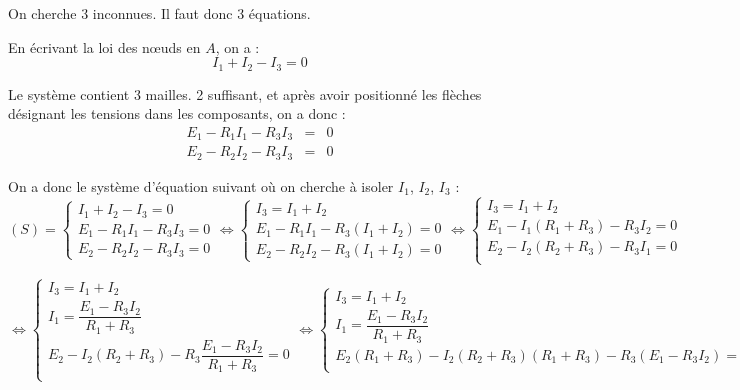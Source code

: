 \documentclass[10pt]{article}
\newif\ifprof
\begin{document}
\ifprof
\begin{corrige}
On cherche 3 inconnues. Il faut donc 3 équations. 

En écrivant la loi des n\oe uds en $A$, on a : 
$$
I_1 + I_2 - I_3 = 0
$$

Le système contient 3 mailles. 2 suffisant, et après avoir positionné les flèches désignant les tensions dans les composants, on a donc :
\begin{eqnarray*}
E_1 - R_1 I_1 - R_3 I_3 &=& 0 \\
E_2 - R_2 I_2 - R_3 I_3 &=& 0 
\end{eqnarray*}

On a donc le système d'équation suivant où on cherche à isoler $I_1$, $I_2$, $I_3$ :
$$
(S) = \left\{
\begin{array}{l}
I_1 + I_2 - I_3 = 0 \\
E_1 - R_1 I_1 - R_3 I_3 = 0 \\
E_2 - R_2 I_2 - R_3 I_3 = 0 
\end{array}
\right.
\Longleftrightarrow
\left\{
\begin{array}{l}
I_3 = I_1 + I_2  \\
E_1 - R_1 I_1 - R_3\left( I_1 + I_2 \right)= 0 \\
E_2 - R_2 I_2 - R_3 \left( I_1 + I_2 \right) = 0 
\end{array}
\right.
\Longleftrightarrow
\left\{
\begin{array}{l}
I_3 = I_1 + I_2  \\
E_1 -I_1 \left( R_1 + R_3\right)  - R_3 I_2= 0 \\
E_2 -I_2 \left( R_2 + R_3\right)  - R_3 I_1= 0 \\
\end{array}
\right.
$$

$$
\Longleftrightarrow
\left\{
\begin{array}{l}
I_3 = I_1 + I_2  \\
I_1 =   \dfrac{E_1- R_3 I_2}{R_1 + R_3}  \\
E_2 -I_2 \left( R_2 + R_3\right)  - R_3 \dfrac{E_1- R_3 I_2}{R_1 + R_3}= 0 \\
\end{array}
\right.
\Longleftrightarrow
\left\{
\begin{array}{l}
I_3 = I_1 + I_2  \\
I_1 =   \dfrac{E_1- R_3 I_2}{R_1 + R_3}  \\
E_2 \left( R_1 + R_3\right)-I_2 \left( R_2 + R_3\right) \left( R_1 + R_3\right) - R_3 (E_1- R_3 I_2)= 0 \\
\end{array}
\right.
$$


\end{corrige}
\end{document}
